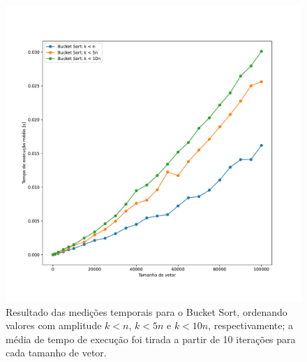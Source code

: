 \documentclass[fontsize=10pt]{article}
\begin{document}
\begin{figure}[H]
\begin{center}
    \includegraphics[scale=0.4]{imagens/bucket.pdf}
    \caption{Resultado das medições temporais para o Bucket Sort, ordenando valores com amplitude $k < n$, $k < 5n$ e $k < 10n$, respectivamente; a média de tempo de execução foi tirada a partir de 10 iterações para cada tamanho de vetor.}
    \label{Figura 5}
\end{center}
\end{figure}
\end{document}
